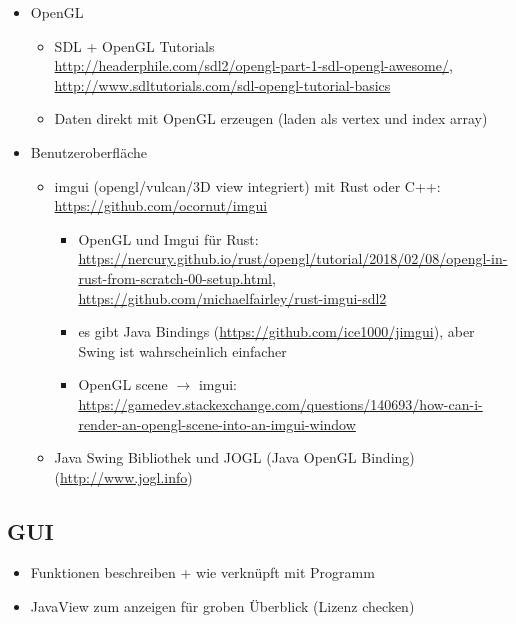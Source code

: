 \begin{itemize}
 \item OpenGL
 \begin {itemize}
  \item SDL + OpenGL Tutorials \\ \url{http://headerphile.com/sdl2/opengl-part-1-sdl-opengl-awesome/}, \\ \url{http://www.sdltutorials.com/sdl-opengl-tutorial-basics}
  \item Daten direkt mit OpenGL erzeugen (laden als vertex und index array)
 \end {itemize}

 \item Benutzeroberfläche
 \begin{itemize}
  \item imgui (opengl/vulcan/3D view integriert) mit Rust oder C++: \url{https://github.com/ocornut/imgui}
  
  \begin{itemize}
   \item OpenGL und Imgui für Rust: \url{https://nercury.github.io/rust/opengl/tutorial/2018/02/08/opengl-in-rust-from-scratch-00-setup.html}, \url{https://github.com/michaelfairley/rust-imgui-sdl2}
   \item es gibt Java Bindings (\url{https://github.com/ice1000/jimgui}), aber Swing ist wahrscheinlich einfacher
   \item OpenGL scene $\rightarrow$ imgui: \url{https://gamedev.stackexchange.com/questions/140693/how-can-i-render-an-opengl-scene-into-an-imgui-window}
  \end{itemize}

  
  \item Java Swing Bibliothek und JOGL (Java OpenGL Binding) (\url{http://www.jogl.info})
 \end{itemize}
\end{itemize}

\subsection{GUI}

\begin{itemize}
 \item Funktionen beschreiben + wie verknüpft mit Programm
 \item JavaView zum anzeigen für groben Überblick (Lizenz checken)
\end{itemize}


